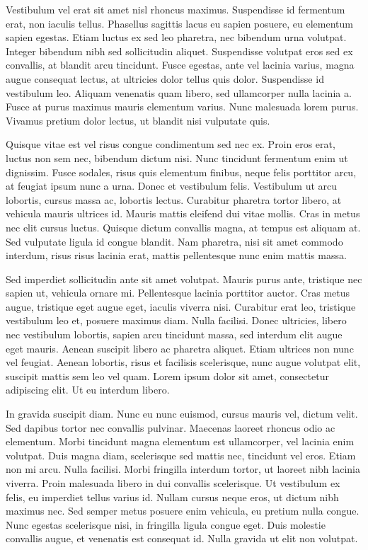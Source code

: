 Vestibulum vel erat sit amet nisl rhoncus maximus. Suspendisse id fermentum erat, non iaculis tellus. Phasellus sagittis lacus eu sapien posuere, eu elementum sapien egestas. Etiam luctus ex sed leo pharetra, nec bibendum urna volutpat. Integer bibendum nibh sed sollicitudin aliquet. Suspendisse volutpat eros sed ex convallis, at blandit arcu tincidunt. Fusce egestas, ante vel lacinia varius, magna augue consequat lectus, at ultricies dolor tellus quis dolor. Suspendisse id vestibulum leo. Aliquam venenatis quam libero, sed ullamcorper nulla lacinia a. Fusce at purus maximus mauris elementum varius. Nunc malesuada lorem purus. Vivamus pretium dolor lectus, ut blandit nisi vulputate quis.

Quisque vitae est vel risus congue condimentum sed nec ex. Proin eros erat, luctus non sem nec, bibendum dictum nisi. Nunc tincidunt fermentum enim ut dignissim. Fusce sodales, risus quis elementum finibus, neque felis porttitor arcu, at feugiat ipsum nunc a urna. Donec et vestibulum felis. Vestibulum ut arcu lobortis, cursus massa ac, lobortis lectus. Curabitur pharetra tortor libero, at vehicula mauris ultrices id. Mauris mattis eleifend dui vitae mollis. Cras in metus nec elit cursus luctus. Quisque dictum convallis magna, at tempus est aliquam at. Sed vulputate ligula id congue blandit. Nam pharetra, nisi sit amet commodo interdum, risus risus lacinia erat, mattis pellentesque nunc enim mattis massa.

Sed imperdiet sollicitudin ante sit amet volutpat. Mauris purus ante, tristique nec sapien ut, vehicula ornare mi. Pellentesque lacinia porttitor auctor. Cras metus augue, tristique eget augue eget, iaculis viverra nisi. Curabitur erat leo, tristique vestibulum leo et, posuere maximus diam. Nulla facilisi. Donec ultricies, libero nec vestibulum lobortis, sapien arcu tincidunt massa, sed interdum elit augue eget mauris. Aenean suscipit libero ac pharetra aliquet. Etiam ultrices non nunc vel feugiat. Aenean lobortis, risus et facilisis scelerisque, nunc augue volutpat elit, suscipit mattis sem leo vel quam. Lorem ipsum dolor sit amet, consectetur adipiscing elit. Ut eu interdum libero.

In gravida suscipit diam. Nunc eu nunc euismod, cursus mauris vel, dictum velit. Sed dapibus tortor nec convallis pulvinar. Maecenas laoreet rhoncus odio ac elementum. Morbi tincidunt magna elementum est ullamcorper, vel lacinia enim volutpat. Duis magna diam, scelerisque sed mattis nec, tincidunt vel eros. Etiam non mi arcu. Nulla facilisi. Morbi fringilla interdum tortor, ut laoreet nibh lacinia viverra. Proin malesuada libero in dui convallis scelerisque. Ut vestibulum ex felis, eu imperdiet tellus varius id. Nullam cursus neque eros, ut dictum nibh maximus nec. Sed semper metus posuere enim vehicula, eu pretium nulla congue. Nunc egestas scelerisque nisi, in fringilla ligula congue eget. Duis molestie convallis augue, et venenatis est consequat id. Nulla gravida ut elit non volutpat.

